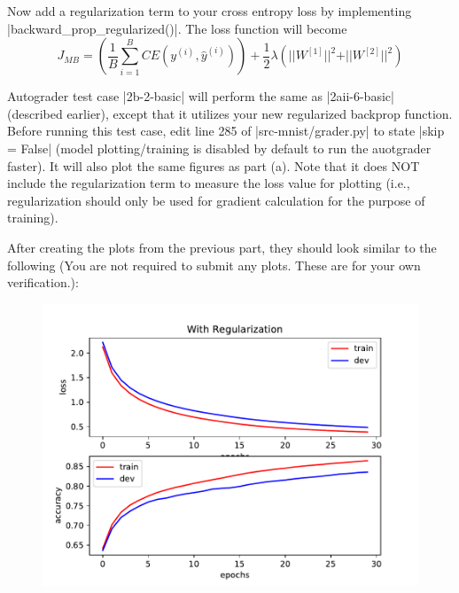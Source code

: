\item {} Now add a regularization term to your cross entropy loss by implementing |backward_prop_regularized()|.
The loss function will become \begin{equation*}
  J_{MB} = \left(\frac{1}{B}\sum_{i=1}^{B}CE(y^{(i)}, \hat{y}^{(i)})\right) + \frac{1}{2} \lambda \left(\vert \vert W^{[1]}\vert \vert ^2 + \vert \vert W^{[2]}\vert \vert ^2 \right)
  \end{equation*}

Autograder test case |2b-2-basic| will perform the same as |2aii-6-basic| (described earlier), except that it utilizes your new regularized backprop function.  Before running this test case, edit line 285 of |src-mnist/grader.py| to state |skip = False| (model plotting/training is disabled by default to run the auotgrader faster).  It will also plot the same
figures as part (a). Note that it does NOT include the regularization term to measure
the loss value for plotting (i.e., regularization should only be used for gradient calculation for
the purpose of training).

\clearpage\newpage
After creating the plots from the previous part, they should look similar to the following (You are not required to submit any plots.  These are for your own verification.):

\begin{figure}[H]
    \centering
    \includegraphics[scale=0.75]{02-mnist/regularized.pdf}
\end{figure}
